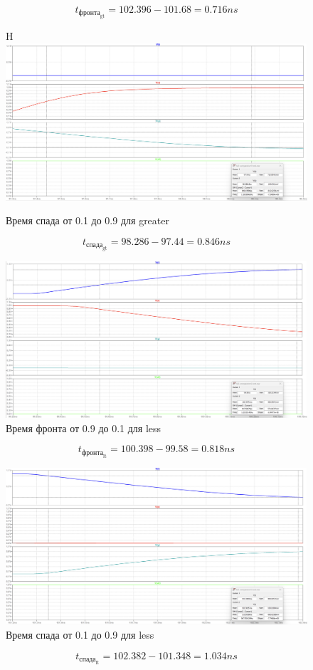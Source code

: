 \documentclass[12pt,onecolumn]{article}
\begin{document}
$$ t_{\text{фронта}_{\text{gt}}}=102.396 - 101.68 = 0.716 ns$$
\begin{figure}{H}
    \centering
    \includegraphics[width=\textwidth]{image/full-cmp-gt-freq-10.png}
    \caption{Время спада от 0.1 до 0.9 для greater}
\end{figure}
$$ t_{\text{спада}_{\text{gt}}}=98.286 - 97.44 = 0.846 ns$$
\begin{figure}[H]
    \centering
    \includegraphics[width=\textwidth]{image/full-cmp-lt-freq-01.png}
    \caption{Время фронта от 0.9 до 0.1 для less}
\end{figure}
$$ t_{\text{фронта}_{\text{lt}}}=100.398 - 99.58 = 0.818 ns$$
\begin{figure}[H]
    \centering
    \includegraphics[width=\textwidth]{image/full-cmp-lt-freq-10.png}
    \caption{Время спада от 0.1 до 0.9 для less}
\end{figure}
$$ t_{\text{спада}_{\text{lt}}}=102.382 - 101.348 = 1.034 ns$$
\end{document}
